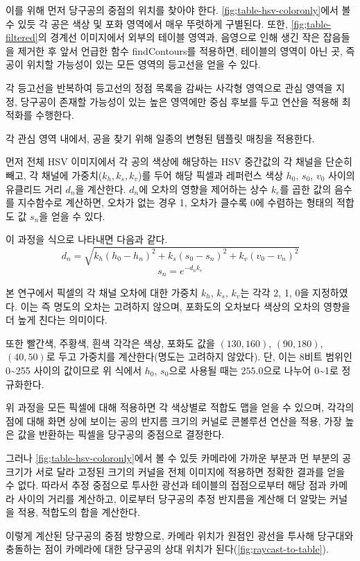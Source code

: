 \documentclass[10pt]{oblivoir}
\begin{document}
이를 위해 먼저 당구공의 중점의 위치를 찾아야 한다. \cref{fig;table-hsv-coloronly}에서 볼 수 있듯 각 공은 색상 및 포화 영역에서 매우 뚜렷하게 구별된다. 또한, \cref{fig;table-filtered}의 경계선 이미지에서 외부의 테이블 영역과, 음영으로 인해 생긴 작은 잡음들을 제거한 후 앞서 언급한 함수 findContours를 적용하면, 테이블의 영역이 아닌 곳, 즉 공이 위치할 가능성이 있는 모든 영역의 등고선을 얻을 수 있다.

각 등고선을 반복하여 등고선의 정점 목록을 감싸는 사각형 영역으로 관심 영역을 지정, 당구공이 존재할 가능성이 있는 높은 영역에만 중심 후보를 두고 연산을 적용해 최적화를 수행한다.

각 관심 영역 내에서, 공을 찾기 위해 일종의 변형된 템플릿 매칭을 적용한다.

먼저 전체 HSV 이미지에서 각 공의 색상에 해당하는 HSV 중간값의 각 채널을 단순히 빼고, 각 채널에 가중치($k_h, k_s, k_v$)를 두어 해당 픽셀과 레퍼런스 색상 $h_0$, $s_0$, $v_0$ 사이의 유클리드 거리 $d_n$을 계산한다. $d_n$에 오차의 영향을 제어하는 상수 $k_e$를 곱한 값의 음수를 지수함수로 계산하면, 오차가 없는 경우 1, 오차가 클수록 0에 수렴하는 형태의 적합도 값 $s_n$을 얻을 수 있다.

이 과정을 식으로 나타내면 다음과 같다.
$$ d_{n} = \sqrt{k_h(h_0-h_n)^2+k_s(s_0-s_n)^2+k_v(v_0-v_n)^2} $$
$$ s_{n} = e^{-d_{n}k_{e}} $$

본 연구에서 픽셀의 각 채널 오차에 대한 가중치 $k_h$, $k_s$, $k_v$는 각각 2, 1, 0을 지정하였다. 이는 즉 명도의 오차는 고려하지 않으며, 포화도의 오차보다 색상의 오차의 영향을 더 높게 친다는 의미이다.

또한 빨간색, 주황색, 흰색 각각은 색상, 포화도 값을 $(130, 160)$, $(90, 180)$, $(40, 50)$로 두고 가중치를 계산한다(명도는 고려하지 않았다). 단, 이는 8비트 범위인 0\~{}255 사이의 값이므로 위 식에서 $h_0$, $s_0$으로 사용될 때는 $255.0$으로 나누어 0\~{}1로 정규화한다.

위 과정을 모든 픽셀에 대해 적용하면 각 색상별로 적합도 맵을 얻을 수 있으며, 각각의 점에 대해 화면 상에 보이는 공의 반지름 크기의 커널로 콘볼루션 연산을 적용, 가장 높은 값을 반환하는 픽셀을 당구공의 중점으로 결정한다.

그러나 \cref{fig;table-hsv-coloronly}에서 볼 수 있듯 카메라에 가까운 부분과 먼 부분의 공 크기가 서로 달라 고정된 크기의 커널을 전체 이미지에 적용하면 정확한 결과를 얻을 수 없다. 따라서 추정 중점으로 투사한 광선과 테이블의 접점으로부터 해당 점과 카메라 사이의 거리를 계산하고, 이로부터 당구공의 추정 반지름을 계산해 더 알맞는 커널을 적용, 적합도의 합을 계산한다.

이렇게 계산된 당구공의 중점 방향으로, 카메라 위치가 원점인 광선을 투사해 당구대와 충돌하는 점이 카메라에 대한 당구공의 상대 위치가 된다(\cref{fig;raycast-to-table}). 
\end{document}
